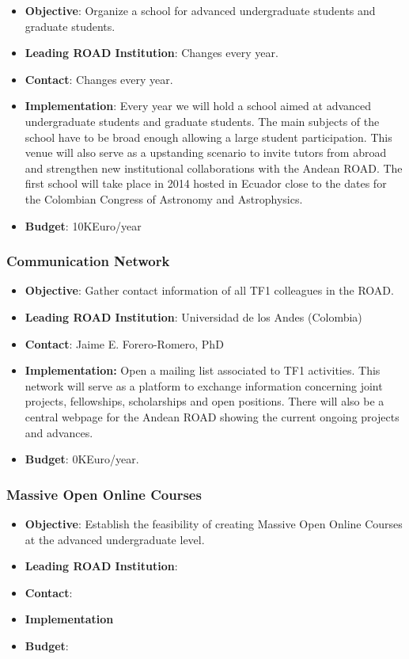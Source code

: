 \documentclass[12pt]{article}
\begin{document}
\begin{itemize}

\item{\bf Objective}: Organize a school for advanced undergraduate
  students and graduate students.
\item{\bf Leading ROAD Institution}: Changes every year.
\item{\bf Contact}: Changes every year.
\item{\bf Implementation}:
Every year we will hold a school aimed at
  advanced undergraduate students and graduate students. The main
  subjects of the school have to be broad enough allowing a large
  student participation. This venue will also serve as a upstanding
  scenario to invite tutors from abroad and strengthen new
  institutional collaborations with the Andean ROAD. The first school
  will take place in 2014 hosted in Ecuador close to the dates for the
  Colombian Congress of Astronomy and Astrophysics.  
\item{\bf Budget}: 10KEuro/year
\end{itemize}

\subsubsection{Communication Network}
\begin{itemize}
  \item{\bf Objective}: Gather contact information of all TF1 colleagues in
    the ROAD.
  \item{\bf Leading ROAD Institution}: Universidad de los Andes (Colombia)
  \item{\bf Contact}: Jaime E. Forero-Romero, PhD
  \item{\bf Implementation:} Open a mailing list associated to TF1
    activities. This network will serve as a platform to exchange
    information concerning joint projects, fellowships, scholarships
    and open positions. There will also be a central webpage for the
    Andean ROAD showing the current ongoing projects and advances.
  \item{\bf Budget}: 0KEuro/year.
\end{itemize}

\subsubsection{Massive Open Online Courses}
\begin{itemize}
\item{\bf Objective}: Establish the feasibility of creating Massive Open
Online Courses at the advanced undergraduate level.
\item{\bf Leading ROAD Institution}:
\item{\bf Contact}:
\item{\bf Implementation}
\item{\bf Budget}:
\end{itemize}
\end{document}
